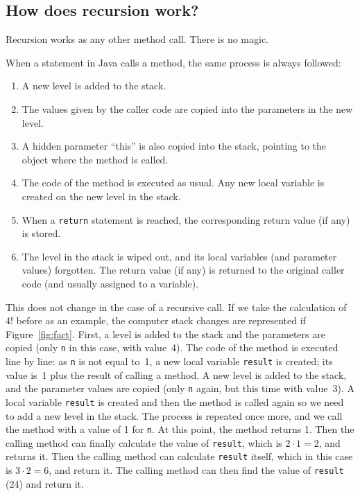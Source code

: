 \subsection{How does recursion work?}
\label{sec:how-does-recursion}

Recursion works as any other method call. There is no magic. 

When a statement in Java calls a method, the same process is always
followed: 

\begin{enumerate}
\item A new level is added to the stack.
\item The values given by the caller code are copied into the
  parameters in the new level.
\item A hidden parameter ``this'' is also copied into the stack,
  pointing to the object where the method is called.
\item The code of the method is executed as usual. Any new local
  variable is created on the new level in the stack. 
\item When a \verb+return+ statement is reached, the corresponding
  return value (if any) is stored.
\item The level in the stack is wiped out, and its local variables
  (and parameter values) forgotten. The return value (if any) is
  returned to the original caller code (and usually assigned to a
  variable).
\end{enumerate}

This does not change in the case of a recursive call. If we take the
calculation of 4! before as an example, the computer stack changes are
represented if Figure~\ref{fig:fact}. First, a level is added to the
stack and the parameters are copied (only \verb+n+ in this case, with
value~4). The code of the method is executed line by line: as \verb+n+
is not 
equal to~1, a new local variable \verb+result+ is created; its value
is~1 plus the result of calling a method. A new level is added to the
stack, and the parameter values are copied (only \verb+n+ again, but
this time with value~3). A local variable \verb+result+ is created and
then the method is called again so we need to add a new level in the
stack. The process is repeated once more, and we call the method with
a value of 1 for \verb+n+. At this point, the method returns 1. Then
the calling method can finally calculate the value of \verb+result+,
which is $2 \cdot 1 = 2$, and returns it. Then the calling method can
calculate \verb+result+ itself, which in this case is $3 \cdot 2 = 6$,
and return it. The calling method can then find the value of
\verb+result+ (24) and return it. 

